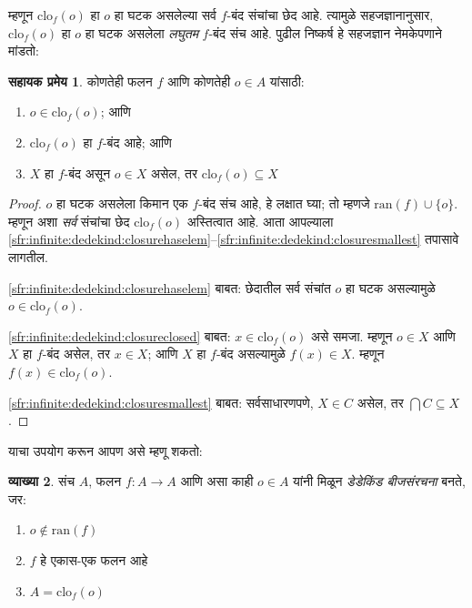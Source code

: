 \documentclass[11pt,a4paper,openany]{book}
\theoremstyle{definition}
\newtheorem{defn}{व्याख्या}[section]
\newcommand{\ran}[1]{\mathrm{ran}(#1)}
\newcommand{\closureofunder}[2]{\mathrm{clo}_{#1}(#2)}
\newtheorem{lem}[defn]{सहायक प्रमेय}
\begin{document}
म्हणून $\closureofunder{f}{o}$ हा $o$ हा घटक असलेल्या सर्व
$f$-बंद संचांचा छेद आहे. त्यामुळे सहजज्ञानानुसार,
$\closureofunder{f}{o}$ हा $o$ हा घटक असलेला \emph{लघुतम}
$f$-बंद संच आहे. पुढील निष्कर्ष हे सहजज्ञान नेमकेपणाने मांडतो:
\begin{lem}\label{sfr:infinite:dedekind:closureproperties}
	कोणतेही फलन $f$ आणि कोणतेही $o \in A$ यांसाठी:
	\begin{enumerate}
		\item\label{sfr:infinite:dedekind:closurehaselem} $o \in \closureofunder{f}{o}$; आणि
		\item\label{sfr:infinite:dedekind:closureclosed} $\closureofunder{f}{o}$ हा $f$-बंद आहे; आणि
		\item\label{sfr:infinite:dedekind:closuresmallest} $X$ हा $f$-बंद असून $o \in
		X$ असेल, तर $\closureofunder{f}{o} \subseteq X$
	\end{enumerate}
\end{lem}

\begin{proof}
$o$ हा घटक असलेला किमान एक $f$-बंद संच आहे, हे लक्षात घ्या;
तो म्हणजे $\ran{f}\cup \{o\}$. म्हणून अशा \emph{सर्व} संचांचा छेद
$\closureofunder{f}{o}$ अस्तित्वात आहे. आता आपल्याला
\ref{sfr:infinite:dedekind:closurehaselem}--\ref{sfr:infinite:dedekind:closuresmallest} तपासावे लागतील.

\ref{sfr:infinite:dedekind:closurehaselem} बाबत: छेदातील सर्व संचांत $o$ हा घटक
असल्यामुळे $o \in \closureofunder{f}{o}$.

\ref{sfr:infinite:dedekind:closureclosed} बाबत: $x \in \closureofunder{f}{o}$ असे समजा.
म्हणून $o \in X$ आणि $X$ हा $f$-बंद असेल, तर $x \in X$; आणि $X$ हा
$f$-बंद असल्यामुळे $f(x) \in X$. म्हणून
$f(x) \in \closureofunder{f}{o}$.

\ref{sfr:infinite:dedekind:closuresmallest} बाबत: सर्वसाधारणपणे, $X \in C$ असेल, तर
$\bigcap C \subseteq X$.
\end{proof}

याचा उपयोग करून आपण असे म्हणू शकतो:

\begin{defn}
संच $A$, फलन $f \colon A \to A$ आणि असा काही $o \in A$ यांनी मिळून
\emph{डेडेकिंड बीजसंरचना} बनते, जर:
	\begin{enumerate}
		\item \label{sfr:infinite:dedekind:ded:proper} $o \notin \ran{f}$
		\item \label{sfr:infinite:dedekind:ded:injection} $f$ हे एकास-एक फलन आहे
		\item \label{sfr:infinite:dedekind:ded:closure} $A = \closureofunder{f}{o}$
	\end{enumerate}
\end{defn}
\end{document}
